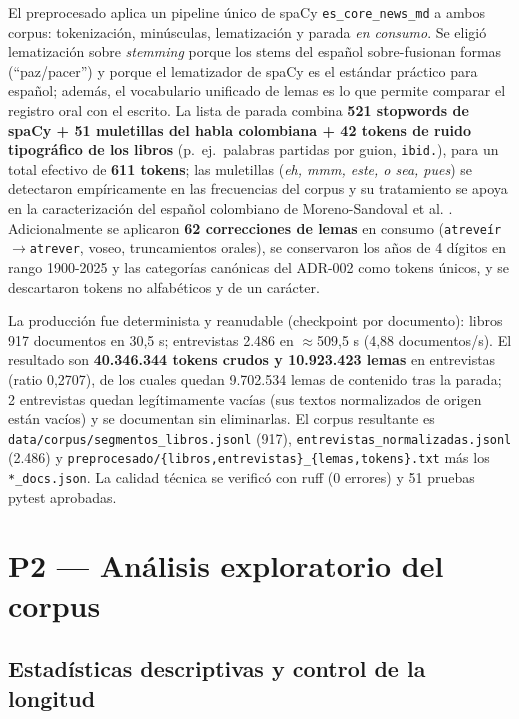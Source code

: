 \documentclass[11pt]{tg_usta}
\begin{document}
El preprocesado aplica un pipeline único de spaCy \texttt{es\_core\_news\_md} \cite{spacy2024model} a ambos corpus: tokenización, minúsculas, lematización y parada \textit{en consumo}. Se eligió lematización sobre \textit{stemming} porque los stems del español sobre-fusionan formas (``paz/pacer'') y porque el lematizador de spaCy es el estándar práctico para español; además, el vocabulario unificado de lemas es lo que permite comparar el registro oral con el escrito. La lista de parada combina \textbf{521 stopwords de spaCy + 51 muletillas del habla colombiana + 42 tokens de ruido tipográfico de los libros} (p.~ej.\ palabras partidas por guion, \texttt{ibid.}), para un total efectivo de \textbf{611 tokens}; las muletillas (\textit{eh, mmm, este, o sea, pues}) se detectaron empíricamente en las frecuencias del corpus y su tratamiento se apoya en la caracterización del español colombiano de Moreno-Sandoval et al. \cite{moreno2024detection}. Adicionalmente se aplicaron \textbf{62 correcciones de lemas} en consumo (\texttt{atreveír}$\rightarrow$\texttt{atrever}, voseo, truncamientos orales), se conservaron los años de 4 dígitos en rango 1900-2025 y las categorías canónicas del ADR-002 como tokens únicos, y se descartaron tokens no alfabéticos y de un carácter.

La producción fue determinista y reanudable (checkpoint por documento): libros 917 documentos en 30,5 s; entrevistas 2.486 en $\approx$509,5 s (4,88 documentos/s). El resultado son \textbf{40.346.344 tokens crudos y 10.923.423 lemas} en entrevistas (ratio 0,2707), de los cuales quedan 9.702.534 lemas de contenido tras la parada; 2 entrevistas quedan legítimamente vacías (sus textos normalizados de origen están vacíos) y se documentan sin eliminarlas. El corpus resultante es \texttt{data/corpus/segmentos\_libros.jsonl} (917), \texttt{entrevistas\_normalizadas.jsonl} (2.486) y \texttt{preprocesado/\{libros,entrevistas\}\_\{lemas,tokens\}.txt} más los \texttt{*\_docs.json}. La calidad técnica se verificó con ruff (0 errores) y 51 pruebas pytest aprobadas.


\section{P2 --- Análisis exploratorio del corpus}\label{sec:p2}

\subsection{Estadísticas descriptivas y control de la longitud}
\end{document}
